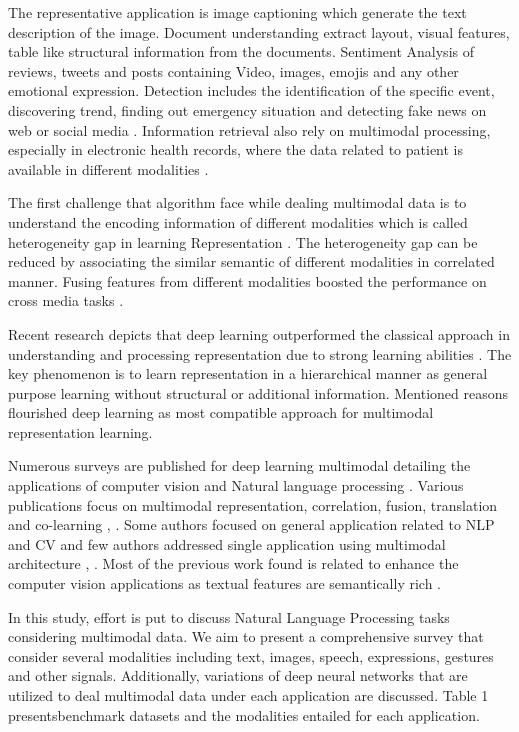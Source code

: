 \documentclass[conference]{IEEEtran}
\begin{document}
The representative application is image captioning which generate the text description of the image. Document understanding \cite{im2021self} extract layout, visual features, table like structural information from the documents. Sentiment Analysis \cite{chandrasekaran2021multimodal} of reviews, tweets and posts containing Video, images, emojis and any other emotional expression. Detection includes the identification of the specific event, discovering trend, finding out emergency situation and detecting fake news on web or social media \cite{wang2022fmfn}. Information retrieval also rely on multimodal processing, especially in electronic health records, where the data related to patient is available in different modalities \cite{zhang2021learning}. 

The first challenge that algorithm face while dealing multimodal data is to understand the encoding information of different modalities which is called heterogeneity gap in learning Representation \cite{rasiwasia2010new}. The heterogeneity gap can be reduced by associating the similar semantic of different modalities in correlated manner. Fusing features from different modalities boosted the performance on cross media tasks \cite{habibian2016video2vec}.  

Recent research depicts that deep learning outperformed the classical approach in understanding and processing representation due to strong learning abilities \cite{lecun2015deep}. The key phenomenon is to learn representation in a hierarchical manner as general purpose learning without structural or additional information. Mentioned reasons flourished deep learning as most compatible approach for multimodal representation learning. 

Numerous surveys are published for deep learning multimodal detailing the applications of computer vision and Natural language processing \cite{ramachandram2017deep}. Various publications focus on multimodal representation, correlation, fusion, translation and co-learning \cite{guo2019deep}, \cite{baltruvsaitis2018multimodal}. Some authors focused on general application related to NLP and CV and few authors addressed single application using multimodal architecture \cite{stappen2021multimodal}, \cite{chandrasekaran2021multimodal}. Most of the previous work found is related to enhance the computer vision applications as textual features are semantically rich \cite{bayoudh2021survey}.  

In this study, effort is put to discuss Natural Language Processing tasks considering multimodal data. We aim to present a comprehensive survey that consider several modalities including text, images, speech, expressions, gestures and other signals. Additionally, variations of deep neural networks that are utilized to deal multimodal data under each application are discussed. Table 1 presentsbenchmark datasets and the modalities entailed for each application. 
 
\end{document}
